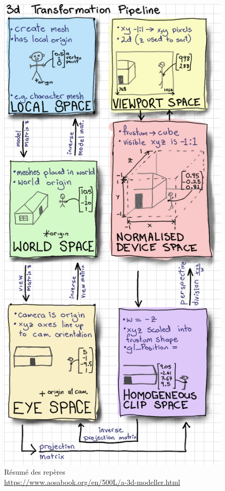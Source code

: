 \documentclass{EPUProjetDi}
\begin{document}
\begin{figure}
	\begin{center}
	\includegraphics[scale=.2]{coordinate_systems}
	\end{center}
	\caption[Résumé des repères]{Résumé des repères\\\url{https://www.aosabook.org/en/500L/a-3d-modeller.html}}
	\label{fig:coordinate_systems}
\end{figure}
\end{document}

